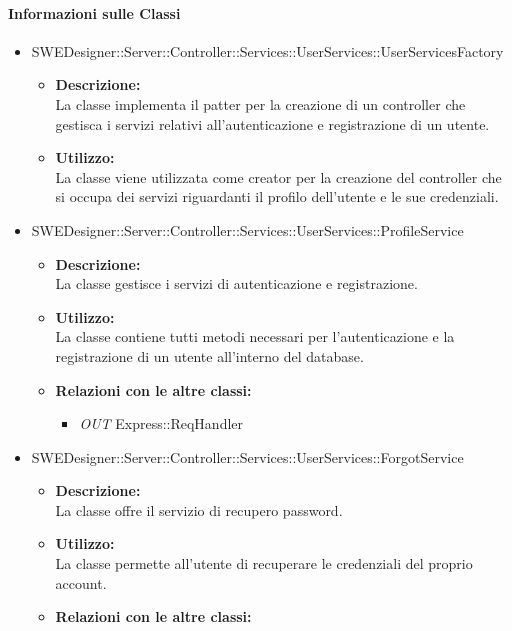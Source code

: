 		\paragraph{Informazioni sulle Classi}
		\begin{itemize}
			\item SWEDesigner::Server::Controller::Services::UserServices::UserServicesFactory
			\begin{itemize}
				\item \textbf{Descrizione: }\\
				La classe implementa il patter  per la creazione di un controller che gestisca i servizi relativi all'autenticazione e registrazione di un utente.
				\item \textbf{Utilizzo: }\\
				La classe viene utilizzata come creator per la creazione del controller che si occupa dei servizi riguardanti il profilo dell'utente e le sue credenziali.
			\end{itemize}
			\item SWEDesigner::Server::Controller::Services::UserServices::ProfileService
			\begin{itemize}
				\item \textbf{Descrizione: }\\
				La classe gestisce i servizi di autenticazione e registrazione.
				\item \textbf{Utilizzo: }\\
				La classe contiene tutti metodi necessari per l'autenticazione e la registrazione di un utente all'interno del database.
				\item \textbf{Relazioni con le altre classi: }
				\begin{itemize}
					\item \emph{OUT} Express::ReqHandler
				\end{itemize}
			\end{itemize}
			\item SWEDesigner::Server::Controller::Services::UserServices::ForgotService
			\begin{itemize}
				\item \textbf{Descrizione: }\\
				La classe offre il servizio di recupero password.
				\item \textbf{Utilizzo: }\\
				La classe permette all'utente di recuperare le credenziali del proprio account.
				\item \textbf{Relazioni con le altre classi: }

\end{itemize}
\end{itemize}
